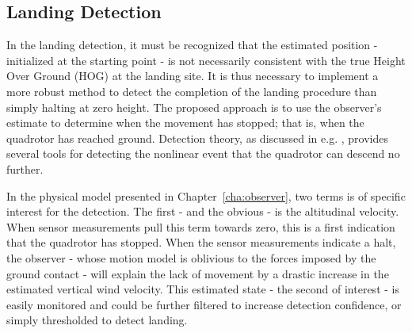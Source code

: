         \subsection{Landing Detection}
        \label{ssec:logic:landing:detection}
            In the landing detection, it must be recognized that the
            estimated position - initialized at the starting point -
            is not necessarily consistent with the true Height Over Ground (HOG)
            at the landing site. It is thus necessary to implement a more robust
            method to detect the completion of the landing procedure than simply halting at zero height.
            The proposed approach is to use the observer's estimate to determine when the movement
            has stopped; that is, when the quadrotor has reached ground.
            Detection theory, as discussed in e.g. \citep{Tornqvist08,nyberg11diagnosis},
            provides several tools for detecting the nonlinear event that
            the quadrotor can descend no further.

            In the physical model presented in Chapter~\ref{cha:observer},
            two terms is of specific interest for the detection.
            The first - and the obvious - is the altitudinal velocity.
            When sensor measurements pull this term towards zero,
            this is a first indication that the quadrotor has stopped.
            When the sensor measurements indicate a halt, the
            observer - whose motion model is oblivious to the forces imposed by the
            ground contact - will explain the lack of movement by a drastic increase in
            the estimated vertical wind velocity.
            This estimated state - the second of interest - is easily monitored
            and could be further filtered to increase detection confidence,
            or simply thresholded to detect landing.
